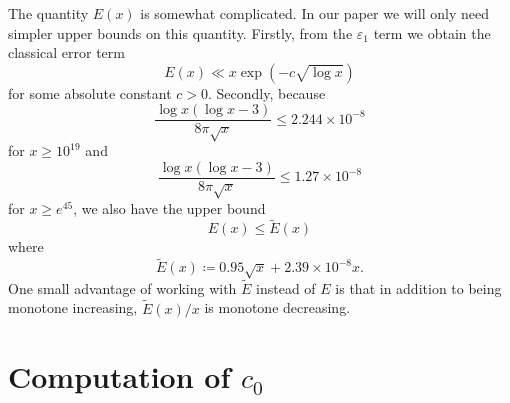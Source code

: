 \documentclass[12pt,a4paper,reqno]{amsart}
\numberwithin{equation}{section}
\theoremstyle{plain}
\theoremstyle{definition}
\newcommand\eps{\varepsilon}
\begin{document}
The quantity $E(x)$ is somewhat complicated.  In our paper we will only need simpler upper bounds on this quantity.  Firstly, from the $\eps_1$ term we obtain the classical error term
\begin{equation}\label{ecx}
E(x) \ll x \exp(-c \sqrt{\log x})
\end{equation}
for some absolute constant $c>0$.  Secondly, because
$$ \frac{\log x (\log x-3)}{8\pi\sqrt{x}}  \leq 2.244 \times 10^{-8}$$
for $x \geq 10^{19}$ and
$$ \frac{\log x (\log x-3)}{8\pi\sqrt{x}}  \leq 1.27 \times 10^{-8}$$
for $x \geq e^{45}$, we also have the upper bound
\begin{equation}\label{ecx-2}
E(x) \leq \tilde E(x)
\end{equation}
where
\begin{equation}\label{tilde-e}
  \tilde E(x) \coloneqq 0.95 \sqrt{x} + 2.39 \times 10^{-8} x.
\end{equation}
One small advantage of working with $\tilde E$ instead of $E$ is that in addition to being monotone increasing, $\tilde E(x)/x$ is monotone decreasing.



  


\section{Computation of \texorpdfstring{$c_0$}{c\_0}}\label{c0-app}
\end{document}
